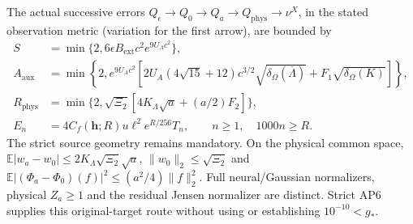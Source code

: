\documentclass[11pt]{article}
\theoremstyle{plain}
\theoremstyle{definition}
\theoremstyle{remark}
\newcommand{\E}{\mathbb{E}}
\begin{document}
The actual successive errors $Q_\epsilon\to Q_0\to Q_a\to
Q_{\mathrm{phys}}\to\nu^X$, in the stated observation metric (variation
for the first arrow), are bounded by
\begin{align*}
 S&=\min\{2,6\epsilon B_{\mathrm{ext}}c^2e^{9U_Ac^2}\},\\
 A_{\mathrm{aux}}&=\min\left\{2,e^{9U_Ac^2}
 \left[2U_A(4\sqrt{15}+12)c^{3/2}\sqrt{\delta_\Omega(\overline\Lambda)}
                 +F_1\sqrt{\delta_\Omega(K)}\right]\right\},\\
 R_{\mathrm{phys}}&=\min\{2,\sqrt{\Xi_2}[4K_\Lambda\sqrt a+(a/2)F_2]\},\\
 E_n&=4C_f(\mathbf h;R)u\ell^2e^{R/256}T_n,
 \qquad n\ge1,\quad1000n\ge R.
\end{align*}
The strict source geometry remains mandatory. On the physical common
space, $\E|w_a-w_0|\le2K_\Lambda\sqrt{\Xi_2}\sqrt a$,
$\|w_0\|_2\le\sqrt{\Xi_2}$ and
$\E|(\Phi_a-\Phi_0)(f)|^2\le(a^2/4)\|f\|_2^2$.
Full neural/Gaussian normalizers, physical $Z_a\ge1$ and the residual
Jensen normalizer are distinct. Strict AP6 supplies this original-target
route without using or establishing $10^{-10}<g_*$.

\end{document}
